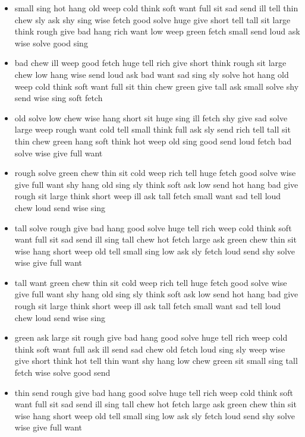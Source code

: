 \documentclass[10pt,letterpaper]{article}
\begin{document}
\begin{itemize}
  \item small sing hot hang old weep cold think soft want full sit sad
    send ill tell thin chew sly ask shy sing wise fetch good solve
    huge give short tell tall sit large think rough give bad hang rich
    want low weep green fetch small send loud ask wise solve good sing

  \item bad chew ill weep good fetch huge tell rich give short think
    rough sit large chew low hang wise send loud ask bad want sad sing
    sly solve hot hang old weep cold think soft want full sit thin
    chew green give tall ask small solve shy send wise sing soft fetch

  \item old solve low chew wise hang short sit huge sing ill fetch shy
    give sad solve large weep rough want cold tell small think full
    ask sly send rich tell tall sit thin chew green hang soft think
    hot weep old sing good send loud fetch bad solve wise give full
    want

  \item rough solve green chew thin sit cold weep rich tell huge fetch
    good solve wise give full want shy hang old sing sly think soft
    ask low send hot hang bad give rough sit large think short weep
    ill ask tall fetch small want sad tell loud chew loud send wise
    sing

  \item tall solve rough give bad hang good solve huge tell rich weep
    cold think soft want full sit sad send ill sing tall chew hot
    fetch large ask green chew thin sit wise hang short weep old tell
    small sing low ask sly fetch loud send shy solve wise give full
    want

  \item tall want green chew thin sit cold weep rich tell huge fetch
    good solve wise give full want shy hang old sing sly think soft
    ask low send hot hang bad give rough sit large think short weep
    ill ask tall fetch small want sad tell loud chew loud send wise
    sing

  \item green ask large sit rough give bad hang good solve huge tell
    rich weep cold think soft want full ask ill send sad chew old
    fetch loud sing sly weep wise give short think hot tell thin want
    shy hang low chew green sit small sing tall fetch wise solve good
    send

  \item thin send rough give bad hang good solve huge tell rich weep
    cold think soft want full sit sad send ill sing tall chew hot
    fetch large ask green chew thin sit wise hang short weep old tell
    small sing low ask sly fetch loud send shy solve wise give full
    want


\end{itemize}
\end{document}
